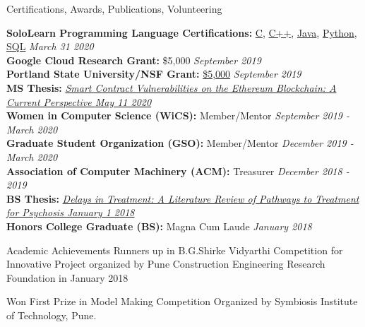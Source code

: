 \documentclass{resume} %
\begin{document}
\begin{rSection}{Certifications, Awards, Publications, Volunteering}

{\bf{SoloLearn Programming Language Certifications:}} 
  \href{https://www.sololearn.com/Certificate/1089-17953779/pdf/?mode=download}{C}, 
  \href{https://www.sololearn.com/Certificate/1051-17953779/pdf/?mode=download}{C++},
  \href{https://www.sololearn.com/Certificate/1068-17953779/pdf/?mode=download}{Java},
  \href{https://www.sololearn.com/Certificate/1073-17953779/pdf/?mode=download}{Python}, 
  \href{https://www.sololearn.com/Certificate/1060-17953779/pdf/?mode=download}{SQL} \hfill {\em{March 31 2020}}\\
{\bf{Google Cloud Research Grant:}} \$5,000 \hfill {\em{September 2019}}\\
  {\bf{Portland State University/NSF Grant:}} \href{https://www.nsf.gov/awardsearch/showAward?AWD\_ID=1821841}{\$5,000} \hfill {\em{September 2019}}\\
  {\bf{MS Thesis:}} \href{https://www.slideshare.net/DanielConnelly15/daniel-connelly-ethereum-smart-contract-masters-thesis}{\itshape{Smart Contract Vulnerabilities on the Ethereum Blockchain: A Current Perspective \hfill {\em{May 11 2020}}}}\\
  {\bf{Women in Computer Science (WiCS):}} Member/Mentor \hfill {\em{September 2019 - March 2020}}\\
  {\bf{Graduate Student Organization (GSO):}} Member/Mentor \hfill {\em{December 2019 - March 2020}}\\
  {\bf{Association of Computer Machinery (ACM):}} Treasurer \hfill {\em{December 2018 - 2019}}\\
  {\bf{BS Thesis:}} \href{https://pdxscholar.library.pdx.edu/honorstheses/496/}{\itshape{Delays in Treatment: A Literature Review of Pathways to Treatment for Psychosis \hfill{\em{January 1 2018}}}}\\
  {\bf{Honors College Graduate (BS):}} Magna Cum Laude \hfill {\em{January 2018}}\\

\end{rSection}






\iffalse
\begin{rSection}{Academic Achievements} 
 Runners up in B.G.Shirke Vidyarthi Competition for Innovative Project organized by Pune Construction Engineering Research Foundation in January 2018
\item Won First Prize in Model Making Competition Organized by Symbiosis Institute of Technology, Pune.
\end{rSection}
\end{document}
